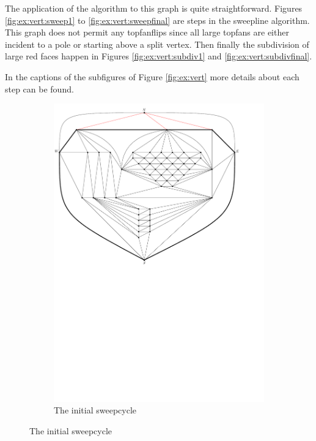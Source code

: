 The application of the algorithm to this graph is quite straightforward. Figures \ref{fig:ex:vert:sweep1} to \ref{fig:ex:vert:sweepfinal} are steps in the sweepline algorithm. This graph does not permit any topfanflips since all large topfans are either incident to a pole or starting above a split vertex. 
Then finally the subdivision of large red faces happen in Figures \ref{fig:ex:vert:subdiv1} and \ref{fig:ex:vert:subdivfinal}.

In the captions of the subfigures of Figure \ref{fig:ex:vert} more details about each step can be found.


\begin{figure}
    \centering
    \begin{subfigure}[b]{.9 \textwidth}
      \includegraphics[width=\textwidth]{examples/img/vertWorstCase/sweep1}
      \caption{The initial sweepcycle}

\end{subfigure}
\end{figure}
